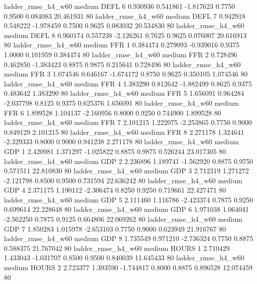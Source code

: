    ladder_rmse_h4_w60     medium     DEFL                 6  0.930936 0.541861 -1.817623 0.7750 0.9500  0.084083   20.461931 80
    ladder_rmse_h4_w60     medium     DEFL                 7  0.942918 0.548222 -1.978459 0.7500 0.9625  0.083032   20.534830 80
    ladder_rmse_h4_w60     medium     DEFL                 8  0.960174 0.557238 -2.126261 0.7625 0.9625  0.076007   20.616913 80
    ladder_rmse_h4_w60     medium      FFR                 1  0.384474 0.279093 -0.939016 0.9375 1.0000  0.101959    0.384474 80
    ladder_rmse_h4_w60     medium      FFR                 2  0.728496 0.462850 -1.383423 0.8875 0.9875  0.215641    0.728496 80
    ladder_rmse_h4_w60     medium      FFR                 3  1.074546 0.646167 -1.674172 0.8750 0.9625  0.350105    1.074546 80
    ladder_rmse_h4_w60     medium      FFR                 4  1.383290 0.812642 -1.882499 0.8625 0.9375  0.483642    1.383290 80
    ladder_rmse_h4_w60     medium      FFR                 5  1.656091 0.964284 -2.037798 0.8125 0.9375  0.625376    1.656091 80
    ladder_rmse_h4_w60     medium      FFR                 6  1.899528 1.104137 -2.160956 0.8000 0.9250  0.744900    1.899528 80
    ladder_rmse_h4_w60     medium      FFR                 7  2.101215 1.222075 -2.253865 0.7750 0.9000  0.849129    2.101215 80
    ladder_rmse_h4_w60     medium      FFR                 8  2.271178 1.324641 -2.329333 0.8000 0.9000  0.941238    2.271178 80
    ladder_rmse_h4_w60     medium      GDP                 1  2.420981 1.371297 -1.025822 0.8875 0.9875  0.526244   23.017305 80
    ladder_rmse_h4_w60     medium      GDP                 2  2.236896 1.189741 -1.562920 0.8875 0.9750  0.571511   22.810830 80
    ladder_rmse_h4_w60     medium      GDP                 3  2.712319 1.271272 -2.121798 0.8500 0.9500  0.731594   22.636242 80
    ladder_rmse_h4_w60     medium      GDP                 4  2.371175 1.190112 -2.306474 0.8250 0.9250  0.719661   22.427471 80
    ladder_rmse_h4_w60     medium      GDP                 5  2.111460 1.116786 -2.423374 0.7875 0.9250  0.699614   22.228648 80
    ladder_rmse_h4_w60     medium      GDP                 6  1.971038 1.064041 -2.562250 0.7875 0.9125  0.664806   22.069262 80
    ladder_rmse_h4_w60     medium      GDP                 7  1.850283 1.015978 -2.653103 0.7750 0.9000  0.623949   21.916767 80
    ladder_rmse_h4_w60     medium      GDP                 8  1.735549 0.971210 -2.736324 0.7750 0.8875  0.588375   21.767042 80
    ladder_rmse_h4_w60     medium    HOURS                 1  2.710429 1.433043 -1.031707 0.8500 0.9500  0.840039   11.645433 80
    ladder_rmse_h4_w60     medium    HOURS                 2  2.723377 1.393590 -1.744817 0.8000 0.8875  0.896528   12.074459 80
